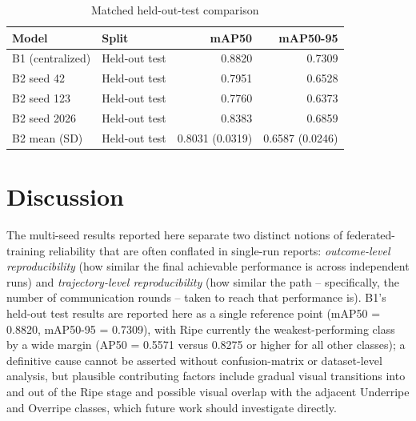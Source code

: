 \documentclass[11pt]{article}
\begin{document}
\begin{table}[H]
  \centering
  \caption{Matched held-out-test comparison}
  \label{tab:matched}
  \begin{tabular}{llrr}
    \toprule
    Model & Split & mAP50 & mAP50-95 \\
    \midrule
    B1 (centralized) & Held-out test & 0.8820 & 0.7309 \\
    B2 seed 42       & Held-out test & 0.7951 & 0.6528 \\
    B2 seed 123      & Held-out test & 0.7760 & 0.6373 \\
    B2 seed 2026     & Held-out test & 0.8383 & 0.6859 \\
    B2 mean (SD)     & Held-out test & 0.8031 (0.0319) & 0.6587 (0.0246) \\
    \bottomrule
  \end{tabular}
\end{table}

\section{Discussion}

The multi-seed results reported here separate two distinct notions of federated-training reliability that are often conflated in single-run reports: \emph{outcome-level reproducibility} (how similar the final achievable performance is across independent runs) and \emph{trajectory-level reproducibility} (how similar the path -- specifically, the number of communication rounds -- taken to reach that performance is). B1's held-out test results are reported here as a single reference point (mAP50 = 0.8820, mAP50-95 = 0.7309), with Ripe currently the weakest-performing class by a wide margin (AP50 = 0.5571 versus 0.8275 or higher for all other classes); a definitive cause cannot be asserted without confusion-matrix or dataset-level analysis, but plausible contributing factors include gradual visual transitions into and out of the Ripe stage and possible visual overlap with the adjacent Underripe and Overripe classes, which future work should investigate directly.
\end{document}
